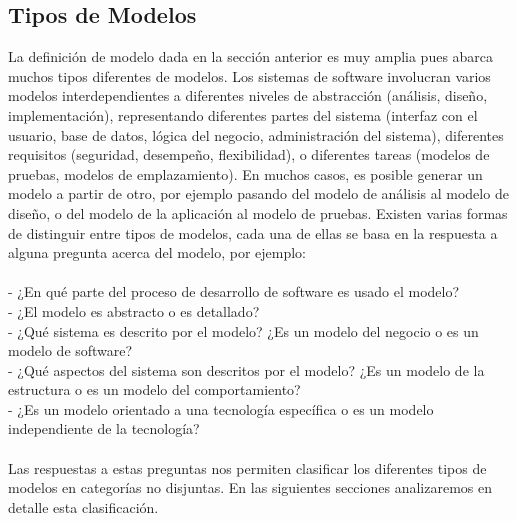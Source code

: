 \subsection{Tipos de Modelos}
La definición de modelo dada en la sección anterior es muy amplia pues abarca muchos tipos diferentes de modelos. Los sistemas de software involucran varios modelos interdependientes a diferentes niveles de abstracción (análisis, diseño, implementación), representando diferentes partes del sistema (interfaz con el usuario, base de datos, lógica del negocio, administración del sistema), diferentes requisitos (seguridad, desempeño, flexibilidad), o diferentes tareas (modelos de pruebas, modelos de emplazamiento). En muchos casos, es posible generar un modelo a partir de otro, por ejemplo pasando del modelo de análisis al modelo de diseño, o del modelo de la aplicación al modelo de pruebas. Existen varias formas de distinguir entre tipos de modelos, cada una de ellas se basa en la respuesta a alguna pregunta acerca del modelo, por ejemplo:\\ \\
- ¿En qué parte del proceso de desarrollo de software es usado el modelo?\\
 - ¿El modelo es abstracto o es detallado?\\
 - ¿Qué sistema es descrito por el modelo? ¿Es un modelo del negocio o es un modelo de software?\\
 - ¿Qué aspectos del sistema son descritos por el modelo? ¿Es un modelo de la estructura o es un modelo del comportamiento?\\ 
- ¿Es un modelo orientado a una tecnología específica o es un modelo independiente de la tecnología?\\ \\
Las respuestas a estas preguntas nos permiten clasificar los diferentes tipos de modelos en categorías no disjuntas. En las siguientes secciones analizaremos en detalle esta clasificación.
\\\\

